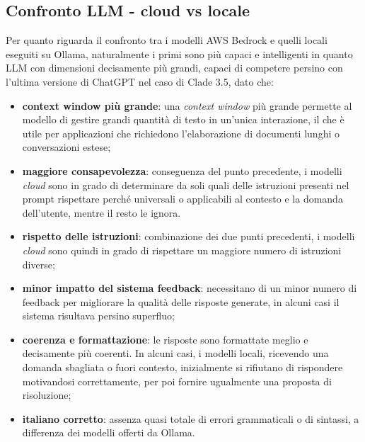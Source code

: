 \subsection{Confronto LLM - cloud vs locale}
Per quanto riguarda il confronto tra i modelli AWS Bedrock e quelli locali eseguiti su Ollama, naturalmente i primi sono più capaci e intelligenti in quanto LLM con dimensioni decisamente più grandi, capaci di competere persino con l'ultima versione di ChatGPT nel caso di Clade 3.5, dato che: 
\begin{itemize}
    \item \textbf{context window più grande}: una \textit{context window} più grande 
    permette al modello di gestire grandi quantità di testo in un'unica interazione, il 
    che è utile per applicazioni che richiedono l'elaborazione di documenti lunghi o 
    conversazioni estese;
    \item \textbf{maggiore consapevolezza}: conseguenza del punto precedente, i modelli \textit{cloud} sono in grado di determinare da soli quali delle istruzioni presenti nel prompt rispettare perché universali 
    o applicabili al contesto e la domanda dell'utente, mentre il resto le ignora. 
    \item \textbf{rispetto delle istruzioni}: combinazione dei due punti precedenti, i modelli \textit{cloud} sono quindi in grado di rispettare un maggiore numero di istruzioni diverse;
    \item \textbf{minor impatto del sistema feedback}: necessitano di un minor numero di feedback per migliorare la qualità delle risposte generate, in alcuni casi il sistema risultava persino superfluo; 
    \item \textbf{coerenza e formattazione}: le risposte sono formattate meglio e 
    decisamente più coerenti. In alcuni casi, i modelli locali, ricevendo una domanda 
    sbagliata o fuori contesto, inizialmente si rifiutano di rispondere motivandosi 
    correttamente, per poi fornire ugualmente una proposta di risoluzione;
    \item \textbf{italiano corretto}: assenza quasi totale di errori grammaticali o di sintassi, a differenza dei modelli offerti da Ollama.
\end{itemize}

